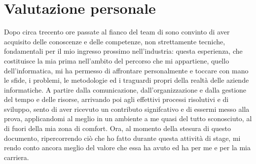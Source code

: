\section{Valutazione personale}

Dopo circa trecento ore passate al fianco del team di \myAzienda sono convinto di aver acquisito delle conoscenze e delle competenze, non strettamente tecniche, fondamentali per il mio ingresso prossimo nell'industria: questa esperienza, che costituisce la mia prima nell'ambito del percorso che mi appartiene, quello dell'informatica, mi ha permesso di affrontare personalmente e toccare con mano le sfide, i problemi, le metodologie ed i traguardi propri della realtà delle aziende informatiche. A partire dalla comunicazione, dall'organizzazione e dalla gestione del tempo e delle risorse, arrivando poi agli effettivi processi risolutivi e di sviluppo, sento di aver ricevuto un contributo signifcativo e di essermi messo alla prova, applicandomi al meglio in un ambiente a me quasi del tutto sconosciuto, al di fuori della mia zona di comfort. Ora, al momento della stesura di questo documento, ripercorrendo ciò che ho fatto durante questa attività di stage, mi rendo conto ancora meglio del valore che essa ha avuto ed ha per me e per la mia carriera.
